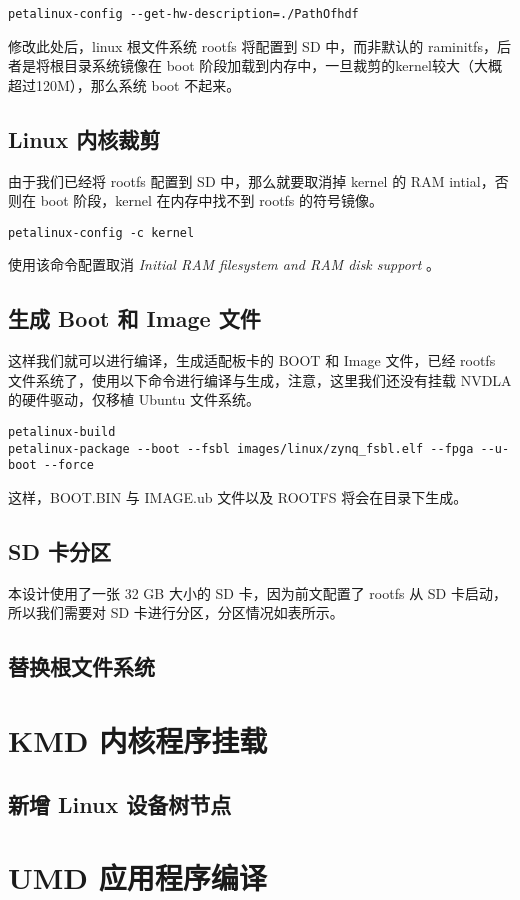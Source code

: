 \begin{lstlisting}
petalinux-config --get-hw-description=./PathOfhdf
\end{lstlisting}

修改此处后，linux 根文件系统 rootfs 将配置到 SD 中，而非默认的  raminitfs，后者是将根目录系统镜像在 boot 阶段加载到内存中，一旦裁剪的kernel较大（大概超过120M），那么系统 boot 不起来。

\subsection{Linux 内核裁剪}

由于我们已经将 rootfs 配置到 SD 中，那么就要取消掉 kernel 的 RAM intial，否则在 boot 阶段，kernel 在内存中找不到 rootfs 的符号镜像。

\begin{lstlisting}
petalinux-config -c kernel
\end{lstlisting}

使用该命令配置取消 \emph{Initial RAM filesystem and RAM disk support} 。

\subsection{生成 Boot 和 Image 文件}

这样我们就可以进行编译，生成适配板卡的 BOOT 和 Image 文件，已经 rootfs 文件系统了，使用以下命令进行编译与生成，注意，这里我们还没有挂载 NVDLA 的硬件驱动，仅移植 Ubuntu 文件系统。

\begin{lstlisting}
petalinux-build
petalinux-package --boot --fsbl images/linux/zynq_fsbl.elf --fpga --u-boot --force
\end{lstlisting}

这样，BOOT.BIN 与 IMAGE.ub 文件以及 ROOTFS 将会在目录下生成。

\subsection{SD 卡分区}

本设计使用了一张 32 GB 大小的 SD 卡，因为前文配置了 rootfs 从 SD 卡启动，所以我们需要对 SD 卡进行分区，分区情况如表所示。





\subsection{替换根文件系统}



\section{KMD 内核程序挂载}

\subsection{新增 Linux 设备树节点}

\section{UMD 应用程序编译}
